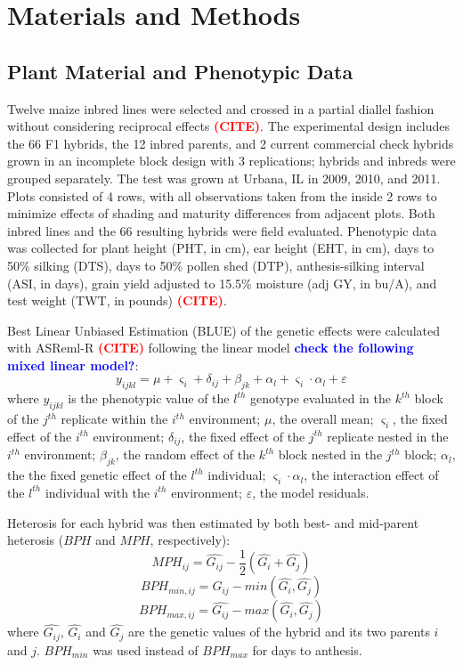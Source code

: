 \documentclass[9pt,twocolumn,twoside]{gsajnl}
\newcommand{\sme}[1]{\textcolor{red}{\bf #1}}
\newcommand{\yang}[1]{\textcolor{blue}{\bf #1}}
\begin{document}
\section*{Materials and Methods}

\subsection*{Plant Material and Phenotypic Data}
Twelve maize inbred lines were selected and crossed in a partial diallel fashion without considering reciprocal effects \sme{(CITE)}. The experimental design includes the 66 F1 hybrids, the 12 inbred parents, and 2 current commercial check hybrids grown in an incomplete block design with 3 replications; hybrids and inbreds were grouped separately. The test was grown at Urbana, IL in 2009, 2010, and 2011.  Plots consisted of 4 rows, with all observations taken from the inside 2 rows to minimize effects of shading and maturity differences from adjacent plots. Both inbred lines and the 66 resulting hybrids were field evaluated. Phenotypic data was collected for plant height (PHT, in cm), ear height (EHT, in cm), days to 50\% silking (DTS), days to 50\% pollen shed (DTP), anthesis-silking interval (ASI, in days), grain yield adjusted to 15.5\% moisture (adj GY, in bu/A), and test weight (TWT, in pounds) \sme{(CITE)}.%

Best Linear Unbiased Estimation (BLUE) of the genetic effects were calculated with ASReml-R \sme{(CITE)} following the linear model \yang{check the following mixed linear model?}: 
%
\[y_{ijkl} = \mu + \varsigma_{i} + \delta_{ij} + \beta_{jk} + \alpha_{l} +  \varsigma_{i} \cdot \alpha_{l} + \varepsilon\]
%
where 
$y_{ijkl}$ is the phenotypic value of the $l^{th}$ genotype evaluated in the $k^{th}$ block of the $j^{th}$ replicate within the $i^{th}$ environment; 
$\mu$, the overall mean; 
$\varsigma_{i}$, the fixed effect of the $i^{th}$ environment;
$\delta_{ij}$, the fixed effect of the $j^{th}$ replicate nested in the $i^{th}$ environment; 
$\beta_{jk}$, the random effect of the $k^{th}$ block nested in the $j^{th}$ block; 
$\alpha_{l}$, the the fixed genetic effect  of the $l^{th}$ individual; 
$\varsigma_{i} \cdot \alpha_{l}$, the interaction effect of the $l^{th}$ individual with the $i^{th}$ environment; 
$\varepsilon$, the model residuals.


Heterosis for each hybrid was then estimated by both best- and mid-parent heterosis ($BPH$ and $MPH$, respectively):
%
\[ MPH_{ij}=\hat{G_{ij}}-\frac{1}{2}(\hat{G_{i}}+\hat{G_{j}}) \]
\[ BPH_{min,ij}=\hat{G_{ij}}-min(\hat{G_{i}} ,\hat{G_{j}}) \] 
\[ BPH_{max,ij}=\hat{G_{ij}}-max(\hat{G_{i}} ,\hat{G_{j}}) \]
%
where $\hat{G_{ij}}$, $\hat{G_{i}}$ and $\hat{G_{j}}$ are the genetic values of the hybrid and its two parents $i$ and $j$. $BPH_{min}$ was used instead of $BPH_{max}$ for days to anthesis.\\
\end{document}

